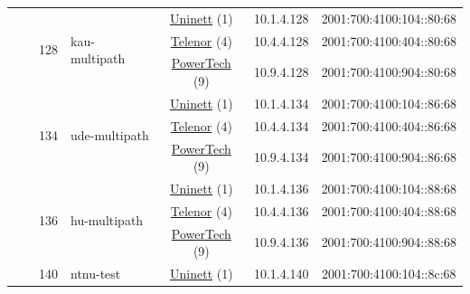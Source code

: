 \begin{small}
\begin{center}
\begin{longtable}{|c|c|c|c|c|c|c|c|}
  &  & \multirow{3}{*}{\tiny{128}} & \multicolumn{1}{|l|}{\multirow{3}{*}{\tiny{kau-multipath}}} & \multicolumn{2}{|c|}{\tiny{\href{https://www.uninett.no}{Uninett} (1)}} & \tiny{10.1.4.128} & \tiny{2001:700:4100:104::80:68} \\* \cline{5-5}\cline{6-6}\cline{7-7}\cline{8-8}
  &  &  &  & \multicolumn{2}{|c|}{\tiny{\href{https://www.telenor.no}{Telenor} (4)}} & \tiny{10.4.4.128} & \tiny{2001:700:4100:404::80:68} \\* \cline{5-5}\cline{6-6}\cline{7-7}\cline{8-8}
  &  &  &  & \multicolumn{2}{|c|}{\tiny{\href{http://www.powertech.no}{PowerTech} (9)}} & \tiny{10.9.4.128} & \tiny{2001:700:4100:904::80:68} \\* \cline{3-3}\cline{4-4}\cline{5-5}\cline{6-6}\cline{7-7}\cline{8-8}
  &  & \multirow{3}{*}{\tiny{134}} & \multicolumn{1}{|l|}{\multirow{3}{*}{\tiny{ude-multipath}}} & \multicolumn{2}{|c|}{\tiny{\href{https://www.uninett.no}{Uninett} (1)}} & \tiny{10.1.4.134} & \tiny{2001:700:4100:104::86:68} \\* \cline{5-5}\cline{6-6}\cline{7-7}\cline{8-8}
  &  &  &  & \multicolumn{2}{|c|}{\tiny{\href{https://www.telenor.no}{Telenor} (4)}} & \tiny{10.4.4.134} & \tiny{2001:700:4100:404::86:68} \\* \cline{5-5}\cline{6-6}\cline{7-7}\cline{8-8}
  &  &  &  & \multicolumn{2}{|c|}{\tiny{\href{http://www.powertech.no}{PowerTech} (9)}} & \tiny{10.9.4.134} & \tiny{2001:700:4100:904::86:68} \\* \cline{3-3}\cline{4-4}\cline{5-5}\cline{6-6}\cline{7-7}\cline{8-8}
  &  & \multirow{3}{*}{\tiny{136}} & \multicolumn{1}{|l|}{\multirow{3}{*}{\tiny{hu-multipath}}} & \multicolumn{2}{|c|}{\tiny{\href{https://www.uninett.no}{Uninett} (1)}} & \tiny{10.1.4.136} & \tiny{2001:700:4100:104::88:68} \\* \cline{5-5}\cline{6-6}\cline{7-7}\cline{8-8}
  &  &  &  & \multicolumn{2}{|c|}{\tiny{\href{https://www.telenor.no}{Telenor} (4)}} & \tiny{10.4.4.136} & \tiny{2001:700:4100:404::88:68} \\* \cline{5-5}\cline{6-6}\cline{7-7}\cline{8-8}
  &  &  &  & \multicolumn{2}{|c|}{\tiny{\href{http://www.powertech.no}{PowerTech} (9)}} & \tiny{10.9.4.136} & \tiny{2001:700:4100:904::88:68} \\* \cline{3-3}\cline{4-4}\cline{5-5}\cline{6-6}\cline{7-7}\cline{8-8}
  &  & \multirow{3}{*}{\tiny{140}} & \multicolumn{1}{|l|}{\multirow{3}{*}{\tiny{ntnu-test}}} & \multicolumn{2}{|c|}{\tiny{\href{https://www.uninett.no}{Uninett} (1)}} & \tiny{10.1.4.140} & \tiny{2001:700:4100:104::8c:68} \\* \cline{5-5}\cline{6-6}\cline{7-7}\cline{8-8}

\end{longtable}
\end{center}
\end{small}
